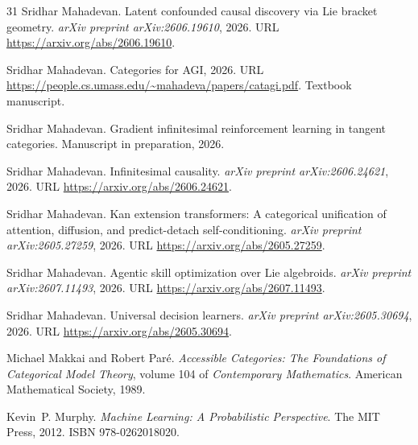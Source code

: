 \documentclass{article}
\begin{document}
\begin{thebibliography}{31}
Sridhar Mahadevan.
\newblock Latent confounded causal discovery via {Lie} bracket geometry.
\newblock \emph{arXiv preprint arXiv:2606.19610}, 2026{}.
\newblock URL \url{https://arxiv.org/abs/2606.19610}.

Sridhar Mahadevan.
\newblock Categories for {AGI}, 2026{}.
\newblock URL \url{https://people.cs.umass.edu/~mahadeva/papers/catagi.pdf}.
\newblock Textbook manuscript.

Sridhar Mahadevan.
\newblock Gradient infinitesimal reinforcement learning in tangent categories.
\newblock Manuscript in preparation, 2026{}.

Sridhar Mahadevan.
\newblock Infinitesimal causality.
\newblock \emph{arXiv preprint arXiv:2606.24621}, 2026{}.
\newblock URL \url{https://arxiv.org/abs/2606.24621}.

Sridhar Mahadevan.
\newblock Kan extension transformers: A categorical unification of attention, diffusion, and predict-detach self-conditioning.
\newblock \emph{arXiv preprint arXiv:2605.27259}, 2026{}.
\newblock URL \url{https://arxiv.org/abs/2605.27259}.

Sridhar Mahadevan.
\newblock Agentic skill optimization over {Lie} algebroids.
\newblock \emph{arXiv preprint arXiv:2607.11493}, 2026{}.
\newblock URL \url{https://arxiv.org/abs/2607.11493}.

Sridhar Mahadevan.
\newblock Universal decision learners.
\newblock \emph{arXiv preprint arXiv:2605.30694}, 2026{}.
\newblock URL \url{https://arxiv.org/abs/2605.30694}.

Michael Makkai and Robert Par{\'e}.
\newblock \emph{Accessible Categories: The Foundations of Categorical Model Theory}, volume 104 of \emph{Contemporary Mathematics}.
\newblock American Mathematical Society, 1989.

Kevin~P. Murphy.
\newblock \emph{Machine Learning: A Probabilistic Perspective}.
\newblock The MIT Press, 2012.
\newblock ISBN 978-0262018020.


\end{thebibliography}
\end{document}
